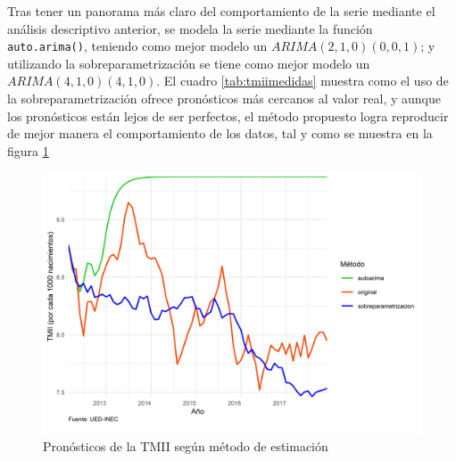 \documentclass[
]{article}
\begin{document}
Tras tener un panorama más claro del comportamiento de la serie mediante
el análisis descriptivo anterior, se modela la serie mediante la función
\texttt{auto.arima()}, teniendo como mejor modelo un
\(ARIMA(2,1,0)(0,0,1)\); y utilizando la sobreparametrización se tiene
como mejor modelo un \(ARIMA(4,1,0)(4,1,0)\). El cuadro
\ref{tab:tmiimedidas} muestra como el uso de la sobreparametrización
ofrece pronósticos más cercanos al valor real, y aunque los pronósticos
están lejos de ser perfectos, el método propuesto logra reproducir de
mejor manera el comportamiento de los datos, tal y como se muestra en la
figura \ref{fig:tmiiplotpronostico}

\begin{table}[!h]

\caption{\label{tab:unnamed-chunk-13}\label{tab:tmiimedidas}Medidas de rendimiento según método de estimación para la TMII}
\centering
{}
\end{table}

\begin{figure}[!h]
\includegraphics[width=1\linewidth,height=1\textheight]{Tesis_files/figure-latex/tmiiplotpronostico-1} \caption{Pronósticos de la TMII según método de estimación}\label{fig:tmiiplotpronostico}
\end{figure}
\end{document}
